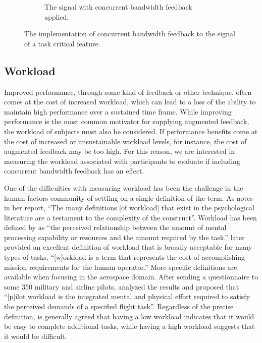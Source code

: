 \begin{figure}[p]
\begin{center}
\begin{subfigure}{0.7\linewidth}
            \caption[The signal with concurrent bandwidth feedback applied]{The signal with concurrent bandwidth feedback applied.}
            \label{fig:signal_w_feedback}
        \end{subfigure}
        \caption[The implementation of concurrent bandwidth feedback to the signal of a task critical feature]{The implementation of concurrent bandwidth feedback to the signal of a task critical feature.}
        \label{fig:cbf}%
    \end{center}
\end{figure}

\subsection{Workload}
Improved performance, through some kind of feedback or other technique, often comes at the cost of increased workload, which can lead to a loss of the ability to maintain high performance over a sustained time frame.
While improving performance is the most common motivator for supplying augmented feedback, the workload of subjects must also be considered.
If performance benefits come at the cost of increased or unsustainable workload levels, for instance, the cost of augmented feedback may be too high.
For this reason, we are interested in measuring the workload associated with participants to evaluate if including concurrent bandwidth feedback has an effect.

One of the difficulties with measuring workload has been the challenge in the human factors community of settling on a single definition of the term.
As \citeauthor{hart_nasa-task_2006} notes in her \citeyear{hart_nasa-task_2006} report, ``The many definitions [of workload] that exist in the psychological literature are a testament to the complexity of the construct''.
Workload has been defined by \citeauthor{hart_development_1988} as ``the perceived relationship between the amount of mental processing capability or resources and the amount required by the task.''
\citeauthor{hart_nasa-task_2006} later provided an excellent definition of workload that is broadly acceptable for many types of tasks, ``[w]orkload is a term that represents the cost of accomplishing mission requirements for the human operator.''
More specific definitions are available when focusing in the aerospace domain.
After sending a questionnaire to some 350 military and airline pilots, \citeauthor{ellis1982airline} analyzed the results and proposed that ``[p]ilot workload is the integrated mental and physical effort required to satisfy the perceived demands of a specified flight task''.
Regardless of the precise definition, is generally agreed that having a low workload indicates that it would be easy to complete additional tasks, while having a high workload suggests that it would be difficult.

